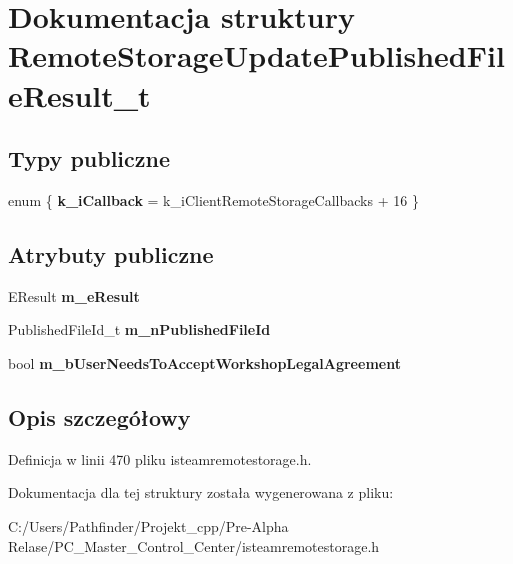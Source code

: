 \hypertarget{struct_remote_storage_update_published_file_result__t}{}\section{Dokumentacja struktury Remote\+Storage\+Update\+Published\+File\+Result\+\_\+t}
\label{struct_remote_storage_update_published_file_result__t}
\subsection*{Typy publiczne}
\begin{DoxyCompactItemize}
\item 
\mbox{\label{struct_remote_storage_update_published_file_result__t_ae60f0bdf9f99f297fa3655cb383ea22a}} 
enum \{ {\bfseries k\+\_\+i\+Callback} = k\+\_\+i\+Client\+Remote\+Storage\+Callbacks + 16
 \}
\end{DoxyCompactItemize}
\subsection*{Atrybuty publiczne}
\begin{DoxyCompactItemize}
\item 
\mbox{\label{struct_remote_storage_update_published_file_result__t_a37d9e5b614b505e710f2e4ddc240cf03}} 
E\+Result {\bfseries m\+\_\+e\+Result}
\item 
\mbox{\label{struct_remote_storage_update_published_file_result__t_a600fc1c90c666735b24749ee2e5754a8}} 
Published\+File\+Id\+\_\+t {\bfseries m\+\_\+n\+Published\+File\+Id}
\item 
\mbox{\label{struct_remote_storage_update_published_file_result__t_afdd0c3432455581dfa122b5e1926e72b}} 
bool {\bfseries m\+\_\+b\+User\+Needs\+To\+Accept\+Workshop\+Legal\+Agreement}
\end{DoxyCompactItemize}


\subsection{Opis szczegółowy}


Definicja w linii 470 pliku isteamremotestorage.\+h.



Dokumentacja dla tej struktury została wygenerowana z pliku\+:\begin{DoxyCompactItemize}
\item 
C\+:/\+Users/\+Pathfinder/\+Projekt\+\_\+cpp/\+Pre-\/\+Alpha Relase/\+P\+C\+\_\+\+Master\+\_\+\+Control\+\_\+\+Center/isteamremotestorage.\+h\end{DoxyCompactItemize}
